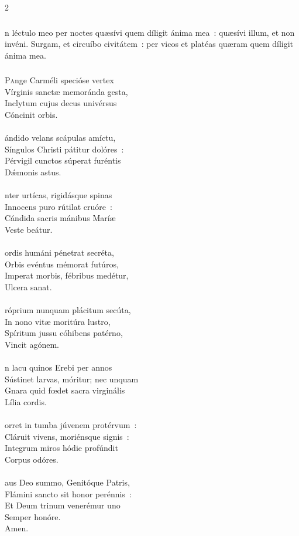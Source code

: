 \documentclass[9pt,twoside]{extarticle}
\begin{document}
\begin{multicols}{2}
{{{\subsubsection*{}
n léctulo meo per noctes quæsívi quem díligit ánima mea~: quæsívi illum, et non invéni. Surgam, et circuíbo civitátem~: per vicos et platéas quæram quem díligit ánima mea.

\subsubsection*{\center {}}
\lettrine{P}ange Carméli specióse vertex\\
Vírginis sanctæ memoránda gesta,\\
Inclytum cujus decus univérsus\\
Cóncinit orbis.\\
\\
ándido velans scápulas amíctu,\\
Síngulos Christi pátitur dolóres~:\\
Pérvigil cunctos súperat furéntis\\
Dǽmonis astus.\\
\\
nter urtícas, rigidásque spinas\\
Innocens puro rútilat cruóre~:\\
Cándida sacris mánibus Maríæ\\
Veste beátur.\\
\\
ordis humáni pénetrat secréta,\\
Orbis evéntus mémorat futúros,\\
Imperat morbis, fébribus medétur,\\
Ulcera sanat.\\
\\
róprium nunquam plácitum secúta,\\
In nono vitæ moritúra lustro,\\
Spíritum jussu cóhibens patérno,\\
Vincit agónem.\\
\\
n lacu quinos Erebi per annos\\
Sústinet larvas, móritur; nec unquam\\
Gnara quid fœdet sacra virginális\\
Lília cordis.\\
\\
orret in tumba júvenem protérvum~:\\
Cláruit vivens, moriénsque signis~:\\
Integrum miros hódie profúndit\\
Corpus odóres.\\
\\
aus Deo summo, Genitóque Patris,\\
Flámini sancto sit honor perénnis~:\\
Et Deum trinum venerémur uno\\
Semper honóre.\\
Amen.

}}}
\end{multicols}
\end{document}
